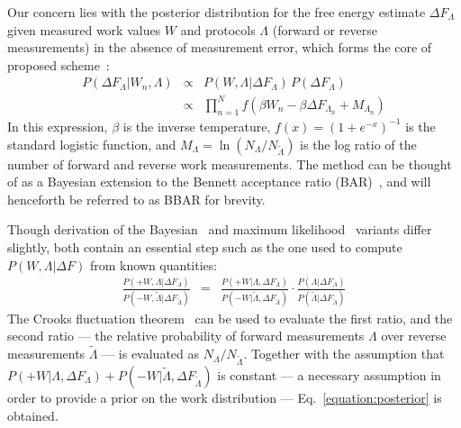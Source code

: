 \documentclass[aps,pre,twocolumn,superscriptaddress,nofootinbib]{revtex4}
\begin{document}
Our concern lies with the posterior distribution for the free energy estimate $\Delta F_\Lambda$ given measured work values $W$ and protocols $\Lambda$ (forward or reverse measurements) in the absence of measurement error, which forms the core of proposed scheme~\cite{maragakis:jcp:2008:bayesian-bar}:
\begin{eqnarray}
P(\Delta F_{\Lambda} | W_n,\Lambda) &\propto& P(W, \Lambda | \Delta F_{\Lambda}) \, P(\Delta F_{\Lambda}) \nonumber \\
&\propto& \prod_{n=1}^N f(\beta W_n - \beta \Delta F_{\Lambda_n} + M_{\Lambda_n}) \label{equation:posterior}
\end{eqnarray}
In this expression, $\beta$ is the inverse temperature, $f(x) = (1+e^{-x})^{-1}$ is the standard logistic function, and  $M_\Lambda = \ln (N_\Lambda / N_{\tilde{\Lambda}})$ is the log ratio of the number of forward and reverse work measurements.
The method can be thought of as a Bayesian extension to the Bennett acceptance ratio (BAR)~\cite{bennett:j-comput-phys:1976:bar}, and will henceforth be referred to as BBAR for brevity.


Though derivation of the Bayesian~\cite{maragakis:jcp:2008:bayesian-bar} and maximum likelihood~\cite{shirts:prl:2003:bar,maragakis:prl:2006:pbar} variants differ slightly, both contain an essential step such as the one used to compute $P(W, \Lambda | \Delta F)$ from known quantities:
\begin{eqnarray}
\frac{P(+W, \Lambda | \Delta F_{\Lambda})}{P(-W, \tilde{\Lambda} | \Delta F_{\tilde{\Lambda}})} &=& \frac{ P(+W | \Lambda, \Delta F_{\Lambda})}{P(-W | \tilde{\Lambda}, \Delta F_{\tilde{\Lambda}})} \cdot \frac{P(\Lambda | \Delta F_{\Lambda})}{P(\tilde{\Lambda} | \Delta F_{\tilde{\Lambda}})} \label{equation:likelihood-ratio}
\end{eqnarray}
The Crooks fluctuation theorem~\cite{crooks:pre:1999:cft} can be used to evaluate the first ratio, and the second ratio --- the relative probability of forward measurements $\Lambda$ over reverse measurements $\tilde{\Lambda}$ --- is evaluated as $N_\Lambda / N_{\tilde{\Lambda}}$.
Together with the assumption that $P(+W | \Lambda, \Delta F_{\Lambda}) + P(-W | \tilde{\Lambda}, \Delta F_{\tilde{\Lambda}})$ is constant --- a necessary assumption in order to provide a prior on the work distribution --- Eq.~\ref{equation:posterior} is obtained.
\end{document}

